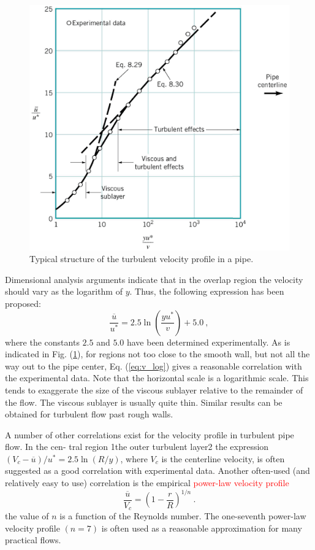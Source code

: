 \documentclass[12pt,a4paper]{article}
\begin{document}
\begin{figure}
\centering
\includegraphics[height=10.cm, angle=0]{velocity_profile_in_pipe.eps}
\caption{
Typical structure of the turbulent velocity profile in a pipe.
}
\label{fig:velocity_profile_in_pipe}
\end{figure}

Dimensional analysis arguments indicate that in the overlap region the velocity should vary as the logarithm of $y$. Thus, the following expression has been proposed:
\begin{equation}
\dfrac{\overline{u}}{u^\ast} = 2.5 \ln\left(  \dfrac{y u^\ast}{v}  \right) + 5.0 ~,
\label{eq:v_log}
\end{equation}
where the constants $2.5$ and $5.0$ have been determined experimentally. As is indicated in Fig. (\ref{fig:velocity_profile_in_pipe}), for regions not too close to the smooth wall, but not all the way out to the pipe center, Eq. (\ref{eq:v_log}) gives a reasonable correlation with the experimental data. Note that the horizontal scale is a logarithmic scale. This tends to exaggerate the size of the viscous sublayer relative to the remainder of the flow. The viscous sublayer is usually quite thin. Similar results can be obtained for turbulent flow past rough walls. 

A number of other correlations exist for the velocity profile in turbulent pipe flow. In the cen- tral region 1the outer turbulent layer2 the expression $(V_c - \overline{u})/u^\ast = 2.5 \ln(R/y)$, where $V_c$ is the centerline velocity, is often suggested as a good correlation with experimental data. Another often-used (and relatively easy to use) correlation is the empirical \textcolor{red}{power-law velocity profile}
\begin{equation}
\dfrac{\overline{u}}{V_c} = \left( 1-\dfrac{r}{R} \right)^{1/n} ~.
\end{equation}
the value of $n$ is a function of the Reynolds number. The one-seventh power-law velocity profile $(n = 7)$ is often used as a reasonable approximation for many practical flows. 
\end{document}
